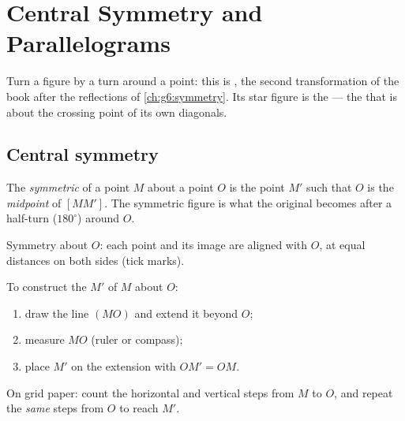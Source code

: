 \chapter{Central Symmetry and Parallelograms}\label{ch:g7:central}

Turn a figure by  a turn around a point: this is \emph{}, the second transformation of the book after the reflections
of \cref{ch:g6:symmetry}. Its star figure is the  --- the
 that is  about the crossing point of its own
diagonals.

\section{Central symmetry}

\begin{definition}\label{def:g7:central:def}
The \emph{symmetric} of a point $M$ about a
point $O$ is the point $M'$ such that $O$ is the \emph{midpoint} of
$[MM']$. The symmetric figure is what the original becomes after a
half-turn ($180^\circ$) around $O$.
\end{definition}

\begin{omfigure}

{\small Symmetry about $O$: each point and its image are aligned with
$O$, at equal distances on both sides (tick marks).}
\end{omfigure}

\begin{method}\label{met:g7:central:construct}
To construct the  $M'$ of $M$ about $O$:
\begin{enumerate}
  \item draw the line $(MO)$ and extend it beyond $O$;
  \item measure $MO$ (ruler or compass);
  \item place $M'$ on the extension with $OM' = OM$.
\end{enumerate}
On grid paper: count the horizontal and vertical steps from $M$ to
$O$, and repeat the \emph{same} steps from $O$ to reach $M'$.
\end{method}

